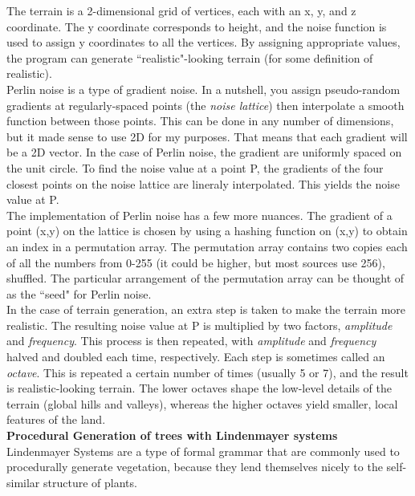\documentclass{article}
\begin{document}
	The terrain is a 2-dimensional grid of vertices, each with an x, y, and z coordinate. The y coordinate corresponds to height, and the noise function is used to assign y coordinates to all the vertices. By assigning appropriate values, the program can generate ``realistic"-looking terrain (for some definition of realistic).
	\\

	Perlin noise is a type of gradient noise. In a nutshell, you assign pseudo-random gradients at regularly-spaced points (the \textit{noise lattice}) then interpolate a smooth function between those points. This can be done in any number of dimensions, but it made sense to use 2D for my purposes. That means that each gradient will be a 2D vector. In the case of Perlin noise, the gradient are uniformly spaced on the unit circle. To find the noise value at a point P, the gradients of the four closest points on the noise lattice are lineraly interpolated. This yields the noise value at P.
	\\

	The implementation of Perlin noise has a few more nuances. The gradient of a point (x,y) on the lattice is chosen by using a hashing function on (x,y) to obtain an index in a permutation array. The permutation array contains two copies each of all the numbers from 0-255 (it could be higher, but most sources use 256), shuffled. The particular arrangement of the permutation array can be thought of as the ``seed" for Perlin noise.
	\\

	In the case of terrain generation, an extra step is taken to make the terrain more realistic. The  resulting noise value at P is multiplied by two factors, \textit{amplitude} and \textit{frequency}. This process is then repeated, with \textit{amplitude} and \textit{frequency} halved and doubled each time, respectively. Each step is sometimes called an \textit{octave}. This is repeated a certain number of times (usually 5 or 7), and the result is realistic-looking terrain. The lower octaves shape the low-level details of the terrain (global hills and valleys), whereas the higher octaves yield smaller, local features of the land.
	\\

	\large\noindent\textbf{Procedural Generation of trees with Lindenmayer systems}
	\normalsize
	\\

	Lindenmayer Systems are a type of formal grammar that are commonly used to procedurally generate vegetation, because they lend themselves nicely to the self-similar structure of plants.
\end{document}

